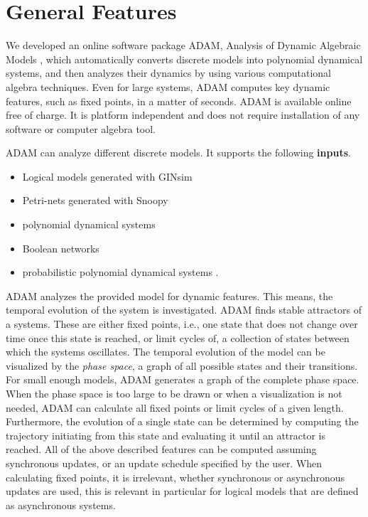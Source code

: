 \documentclass[11pt]{amsart}
\begin{document}
\section{General Features}
We developed an
online software package ADAM, Analysis of Dynamic Algebraic Models \cite{ADAM}, which automatically converts discrete models into polynomial dynamical
systems, and then analyzes their dynamics by using various computational algebra techniques. Even for large systems, ADAM
computes key dynamic features, such as fixed points, in a matter of seconds.
ADAM is available online free of charge. It is platform
independent and does not require installation of any software or computer
algebra tool.
 
ADAM can analyze different discrete models. It supports the following {\bf inputs}.
\begin{itemize}
 \item Logical models generated with GINsim \cite{GINsim}
 \item Petri-nets generated with Snoopy \cite{Snoopy}
 \item polynomial dynamical systems
 \item Boolean networks
 \item probabilistic polynomial dynamical systems \cite{shmulevich}.
\end{itemize}
 
ADAM analyzes the provided model for dynamic features. This means, the temporal evolution of the system is investigated. ADAM finds stable attractors of a systems. These are either fixed points, i.e., one state that does not change over time once this state is reached, or limit cycles of, a collection of states between which the systems oscillates. The temporal evolution of the model can be visualized by the {\it phase space}, a graph of all possible states and their transitions. For small enough models, ADAM generates a graph of the complete phase space.
When the phase space is too large to be drawn or when a visualization is not
needed, ADAM can calculate all fixed points or limit cycles of a given length. Furthermore, the evolution of a single state can be determined by computing the trajectory initiating from this state and evaluating it until an attractor is reached. All of the above described features can be computed assuming synchronous updates, or an update schedule specified by the user. When calculating fixed points, it is irrelevant, whether synchronous or asynchronous updates are used, this is relevant in particular for logical models that are defined as asynchronous systems. 
 
\end{document}
